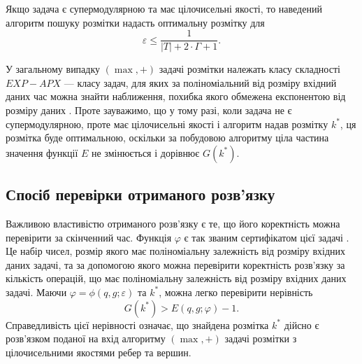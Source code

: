 Якщо задача є супермодулярною та має цілочисельні якості, то наведений алгоритм пошуку розмітки надасть
оптимальну розмітку для 
\begin{equation}
    \varepsilon \leq \frac{1}{|T|+2\cdot\Gamma+1}.
\end{equation}

У загальному випадку $(\max,+)$ задачі розмітки належать класу складності 
$EXP-APX$ --- класу задач, для яких за поліноміальний від розміру вхідний даних час 
можна знайти наближення, похибка якого обмежена експонентою від розміру даних \cite{li2016complexity}.
Проте зауважимо, що у тому разі, коли задача не є супермодулярною, проте має цілочисельні якості і алгоритм надав
розмітку $k^*$, ця розмітка буде оптимальною, оскільки за побудовою алгоритму ціла частина
значення функції $E$ не змінюється і дорівнює $G(k^*)$.

\subsection{Спосіб перевірки отриманого розв'язку}

Важливою властивістю отриманого розв’язку є те, що його коректність можна
перевірити за скінченний час. Функція $\varphi$ є так званим сертифікатом цієї задачі \cite{complexity}.
Це набір чисел, розмір якого має поліноміальну залежність від розміру вхідних даних
задачі, та за допомогою якого можна перевірити коректність розв’язку за кількість
операцій, що має поліноміальну залежність від розміру вхідних даних задачі. 
Маючи $\varphi=\phi(q,g;\varepsilon)$ та $k^*$, можна легко перевірити нерівність
\begin{equation}
    G(k^*)>E(q,g;\varphi)-1.
\end{equation}
Справедливість цієї нерівності означає, що знайдена розмітка $k^*$ дійсно є розв’язком
поданої на вхід алгоритму $(\max,+)$ задачі розмітки з цілочисельними якостями ребер та
вершин.
